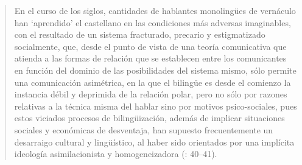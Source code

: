 \documentclass[output=paper]{../langscibook}
\begin{document}
\begin{quote}
En el curso de los siglos, cantidades de hablantes monolingües de vernáculo han ‘aprendido’ el castellano en las condiciones más adversas imaginables, con el resultado de un sistema fracturado, precario y estigmatizado socialmente, que, desde el punto de vista de una teoría comunicativa que atienda a las formas de relación que se establecen entre los comunicantes en función del dominio de las posibilidades del sistema mismo, sólo permite una comunicación asimétrica, en la que el bilingüe es desde el comienzo la instancia débil y deprimida de la relación polar, pero no sólo por razones relativas a la técnica misma del hablar sino por motivos psico-sociales, pues estos viciados procesos de bilingüización, además de implicar situaciones sociales y económicas de desventaja, han supuesto frecuentemente un desarraigo cultural y lingüístico, al haber sido orientados por una implícita ideología asimilacionista y homogeneizadora (\citealt{Rivarola1985}: 40–41).  
\end{quote}
\end{document}
